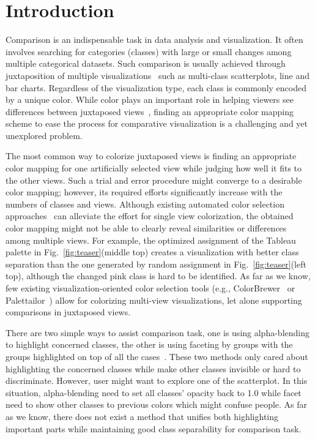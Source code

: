 \section{Introduction}
Comparison is an indispensable task in data analysis and visualization. It often involves searching for categories (classes) with large or small changes among multiple categorical datasets.
Such comparison is usually achieved through juxtaposition of multiple visualizations~\cite{Gleicher18,LYi21} such as multi-class scatterplots, line and bar charts.
Regardless of the visualization type, each class is commonly encoded by a unique color. While color plays an important role in helping viewers see differences between juxtaposed views~\cite{Tominski08,Albers11,Gleicher18}, finding an appropriate color mapping scheme to ease the process for comparative visualization is a challenging and yet unexplored problem.

The most common way to colorize juxtaposed views is finding an appropriate color mapping for one  artificially selected view while judging how well it fits to the other views. Such a trial and error procedure might converge to a desirable color mapping; however, its required efforts significantly increase with the numbers of classes and views. Although existing automated color selection approaches~\cite{Chen14,Wang2018,Lu21} can alleviate the effort for single view colorization, the obtained color mapping might not be able to clearly reveal similarities or differences among multiple views. For example, the optimized assignment\cite{Wang2018} of the Tableau palette in Fig.~\ref{fig:teaser}(middle top) creates a visualization with better class separation than the one generated by random assignment in Fig.~\ref{fig:teaser}(left top), although the changed pink class is hard to be identified.
As far as we know, few existing visualization-oriented color selection tools (e.g., ColorBrewer~\cite{harrower2003colorbrewer} or Palettailor~\cite{Lu21}) allow for colorizing multi-view visualizations, let alone supporting comparisons in juxtaposed views. %

There are two simple ways to assist comparison task, one is using alpha-blending to highlight concerned classes, the other is using faceting by groups with the groups highlighted on top of all the cases~\cite{}. These two methods only cared about highlighting the concerned classes while make other classes invisible or hard to discriminate. However, user might want to explore one of the scatterplot. In this situation, alpha-blending need to set all classes' opacity back to 1.0 while facet need to show other classes to previous colors which might confuse people. As far as we know, there does not exist a method that unifies both highlighting important parts while maintaining good class separability for comparison task.


